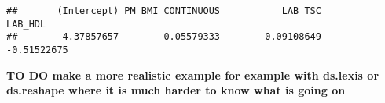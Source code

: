 \documentclass[
]{book}
\newenvironment{Shaded}{\begin{snugshade}}{\end{snugshade}}
\newcommand{\NormalTok}[1]{#1}
\newcommand{\OperatorTok}[1]{\textcolor[rgb]{0.81,0.36,0.00}{\textbf{#1}}}
\begin{document}
\begin{Shaded}
\end{Shaded}

\begin{verbatim}
##       (Intercept) PM_BMI_CONTINUOUS           LAB_TSC           LAB_HDL 
##       -4.37857657        0.05579333       -0.09108649       -0.51522675
\end{verbatim}

\textbf{TO DO make a more realistic example for example with ds.lexis or ds.reshape where it is much harder to know what is going on}

  
\end{document}

